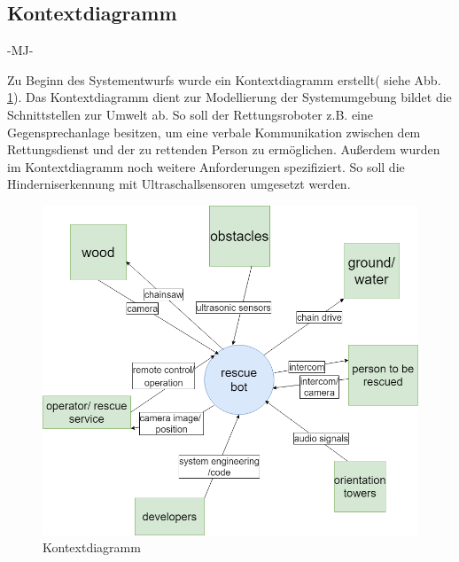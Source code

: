 \subsection{Kontextdiagramm}
-MJ-


Zu Beginn des Systementwurfs wurde ein Kontextdiagramm erstellt( siehe Abb. \ref{fig:context}). Das Kontextdiagramm dient zur Modellierung der Systemumgebung bildet die Schnittstellen zur Umwelt ab. So soll der Rettungsroboter z.B. eine Gegensprechanlage besitzen, um eine verbale Kommunikation zwischen dem Rettungsdienst und der zu rettenden Person zu ermöglichen. Außerdem wurden im Kontextdiagramm noch weitere Anforderungen spezifiziert. So soll die Hinderniserkennung mit Ultraschallsensoren umgesetzt werden.

\begin{figure}[h]
    \centering
    \captionsetup{width=.9\linewidth}
    \includegraphics[width=1\linewidth]{contex_diagram.png}
    \caption{Kontextdiagramm}
    \label{fig:context}
\end{figure}
